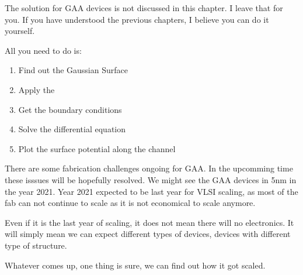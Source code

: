 \documentclass[a4paper]{article}
\begin{document}
The solution for GAA devices is not discussed in this chapter. I leave that for you. If you have understood the previous chapters, I believe you can do it yourself.

All you need to do is:
\begin{enumerate}
\item Find out the Gaussian Surface
\item Apply the \PE
\item Get the boundary conditions
\item Solve the differential equation
\item Plot the surface potential along the channel
\end{enumerate}

There are some fabrication challenges ongoing for GAA. In the upcomming time these isssues will be hopefully resolved. We might see the GAA devices in 5nm in the year 2021. Year 2021 expected to be last year for VLSI scaling, as most of the fab can not continue to scale as it is not economical to scale anymore.

Even if it is the last year of scaling, it does not mean there will no electronics. It will simply mean we can expect different types of devices, devices with different type of structure.

Whatever comes up, one thing is sure, we can find out how it got scaled.

\pagebreak
\end{document}
